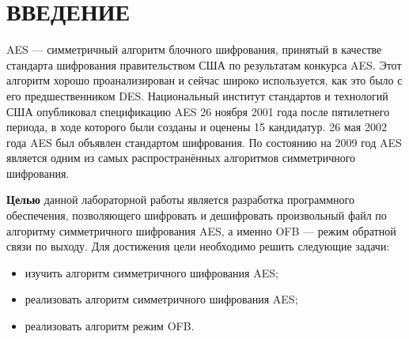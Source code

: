\section*{ВВЕДЕНИЕ}
{}

AES — симметричный алгоритм блочного шифрования, принятый в качестве стандарта шифрования правительством США по результатам конкурса AES. Этот алгоритм хорошо проанализирован и сейчас широко используется, как это было с его предшественником DES. Национальный институт стандартов и технологий США опубликовал спецификацию AES 26 ноября 2001 года после пятилетнего периода, в ходе которого были созданы и оценены 15 кандидатур. 26 мая 2002 года AES был объявлен стандартом шифрования. По состоянию на 2009 год AES является одним из самых распространённых алгоритмов симметричного шифрования.

\textbf{Целью} данной лабораторной работы является разработка программного обеспечения, позволяющего шифровать и дешифровать произвольный файл по алгоритму симметричного шифрования AES, а именно OFB — режим обратной связи по выходу.
Для достижения цели необходимо решить следующие задачи:
\begin{itemize}
	\item изучить алгоритм симметричного шифрования AES;
	\item реализовать алгоритм симметричного шифрования AES;
	\item реализовать алгоритм режим OFB.
\end{itemize}


\newpage